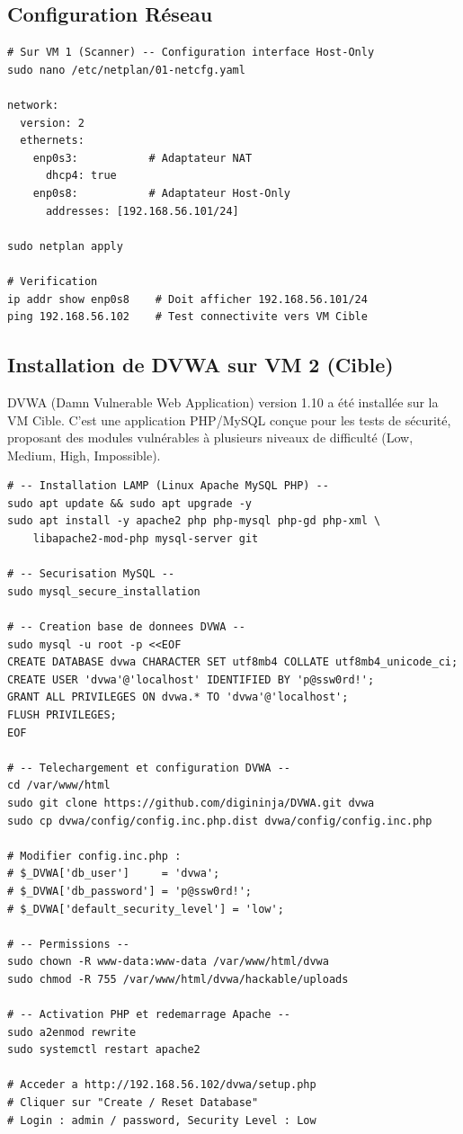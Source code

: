 \documentclass[12pt,a4paper]{report}
\begin{document}
\subsection{Configuration Réseau}

\begin{lstlisting}[style=bash, caption={Configuration réseau Ubuntu (VM 1 — Scanner)}]
# Sur VM 1 (Scanner) -- Configuration interface Host-Only
sudo nano /etc/netplan/01-netcfg.yaml

network:
  version: 2
  ethernets:
    enp0s3:           # Adaptateur NAT
      dhcp4: true
    enp0s8:           # Adaptateur Host-Only
      addresses: [192.168.56.101/24]

sudo netplan apply

# Verification
ip addr show enp0s8    # Doit afficher 192.168.56.101/24
ping 192.168.56.102    # Test connectivite vers VM Cible
\end{lstlisting}

\subsection{Installation de DVWA sur VM 2 (Cible)}

DVWA (Damn Vulnerable Web Application) version 1.10 a été installée sur la VM Cible.
C'est une application PHP/MySQL conçue pour les tests de sécurité, proposant des modules
vulnérables à plusieurs niveaux de difficulté (Low, Medium, High, Impossible).

\begin{lstlisting}[style=bash, caption={Installation complète de DVWA sur Ubuntu (VM 2)}]
# -- Installation LAMP (Linux Apache MySQL PHP) --
sudo apt update && sudo apt upgrade -y
sudo apt install -y apache2 php php-mysql php-gd php-xml \
    libapache2-mod-php mysql-server git

# -- Securisation MySQL --
sudo mysql_secure_installation

# -- Creation base de donnees DVWA --
sudo mysql -u root -p <<EOF
CREATE DATABASE dvwa CHARACTER SET utf8mb4 COLLATE utf8mb4_unicode_ci;
CREATE USER 'dvwa'@'localhost' IDENTIFIED BY 'p@ssw0rd!';
GRANT ALL PRIVILEGES ON dvwa.* TO 'dvwa'@'localhost';
FLUSH PRIVILEGES;
EOF

# -- Telechargement et configuration DVWA --
cd /var/www/html
sudo git clone https://github.com/digininja/DVWA.git dvwa
sudo cp dvwa/config/config.inc.php.dist dvwa/config/config.inc.php

# Modifier config.inc.php :
# $_DVWA['db_user']     = 'dvwa';
# $_DVWA['db_password'] = 'p@ssw0rd!';
# $_DVWA['default_security_level'] = 'low';

# -- Permissions --
sudo chown -R www-data:www-data /var/www/html/dvwa
sudo chmod -R 755 /var/www/html/dvwa/hackable/uploads

# -- Activation PHP et redemarrage Apache --
sudo a2enmod rewrite
sudo systemctl restart apache2

# Acceder a http://192.168.56.102/dvwa/setup.php
# Cliquer sur "Create / Reset Database"
# Login : admin / password, Security Level : Low
\end{lstlisting}
\end{document}

